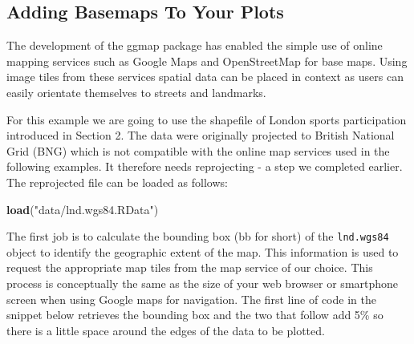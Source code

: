 \documentclass[]{article}
\newenvironment{Shaded}{}{}
\newcommand{\KeywordTok}[1]{\textcolor[rgb]{0.00,0.44,0.13}{\textbf{{#1}}}}
\newcommand{\DecValTok}[1]{\textcolor[rgb]{0.25,0.63,0.44}{{#1}}}
\newcommand{\FloatTok}[1]{\textcolor[rgb]{0.25,0.63,0.44}{{#1}}}
\newcommand{\StringTok}[1]{\textcolor[rgb]{0.25,0.44,0.63}{{#1}}}
\newcommand{\CommentTok}[1]{\textcolor[rgb]{0.38,0.63,0.69}{\textit{{#1}}}}
\newcommand{\NormalTok}[1]{{#1}}
\begin{document}
\subsection{Adding Basemaps To Your Plots}

The development of the ggmap package has enabled the simple use of
online mapping services such as Google Maps and OpenStreetMap for base
maps. Using image tiles from these services spatial data can be placed
in context as users can easily orientate themselves to streets and
landmarks.

For this example we are going to use the shapefile of London sports
participation introduced in Section 2. The data were originally
projected to British National Grid (BNG) which is not compatible with
the online map services used in the following examples. It therefore
needs reprojecting - a step we completed earlier. The reprojected file
can be loaded as follows:

\begin{Shaded}
\begin{Highlighting}[]
\KeywordTok{load}\NormalTok{(}\StringTok{"data/lnd.wgs84.RData"}\NormalTok{)}
\end{Highlighting}
\end{Shaded}

The first job is to calculate the bounding box (bb for short) of the
\texttt{lnd.wgs84} object to identify the geographic extent of the map.
This information is used to request the appropriate map tiles from the
map service of our choice. This process is conceptually the same as the
size of your web browser or smartphone screen when using Google maps for
navigation. The first line of code in the snippet below retrieves the
bounding box and the two that follow add 5\% so there is a little space
around the edges of the data to be plotted.

\begin{Shaded}
\end{Shaded}
\end{document}
